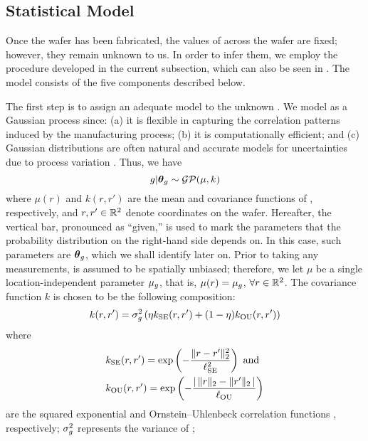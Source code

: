 \subsection{Statistical Model}

Once the wafer has been fabricated, the values of \g across the wafer are fixed;
however, they remain unknown to us. In order to infer them, we employ the
procedure developed in the current subsection, which can also be seen in
. The model consists of the five components
described below.

The first step is to assign an adequate model to the unknown \g. We model \g as
a Gaussian process \cite{rasmussen2006} since: (a) it is flexible in capturing
the correlation patterns induced by the manufacturing process; (b) it is
computationally efficient; and (c) Gaussian distributions are often natural and
accurate models for uncertainties due to process variation \cite{srivastava2010,
reda2009, juan2012}. Thus, we have
\begin{equation} \elab{u-prior}
  \g | \vt_\g \sim \mathcal{GP}(\mu, k)
\end{equation}
where $\mu(r)$ and $k(r, r')$ are the mean and covariance functions of \g,
respectively, and $r, r' \in \real^2$ denote coordinates on the wafer.
Hereafter, the vertical bar, pronounced as ``given,'' is used to mark the
parameters that the probability distribution on the right-hand side depends on.
In this case, such parameters are $\vt_\g$, which we shall identify later on.
Prior to taking any measurements, \g is assumed to be spatially unbiased;
therefore, we let $\mu$ be a single location-independent parameter $\mu_\g$,
that is, $\mu(r) = \mu_\g$, $\forall r \in \real^2$. The covariance function $k$
is chosen to be the following composition:
\begin{equation} \elab{covariance-function}
  k(r, r') = \sigma_\g^2 \left(\eta k_\text{SE}(r, r') + (1 - \eta) k_\text{OU}(r, r')\right)
\end{equation}
where
\begin{align*}
  & k_\text{SE}(r, r') = \exp\left(-\frac{\norm[2]{r - r'}^2}{\ell_\text{SE}^2}\right) \text{ and} \\
  & k_\text{OU}(r, r') = \exp\left(-\frac{\absolute{\,\norm[2]{r} - \norm[2]{r'}\,}}{\ell_\text{OU}}\right)
\end{align*}
are the squared exponential and Ornstein--Uhlenbeck correlation functions
\cite{rasmussen2006}, respectively; $\sigma_\g^2$ represents the variance of \g;
